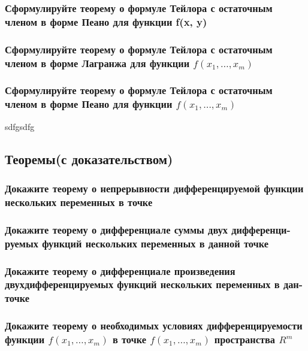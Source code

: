 \documentclass[a4paper, 12pt]{article}
\newcommand{\Rm}{\texorpdfstring{$R^m$}{Lg}}
\def\newline{}%
\begin{document}
            \subsubsection{Сформулируйте теорему о формуле Тейлора с остаточным членом в форме Пеано для функции f(x, y)}



            \subsubsection{Сформулируйте теорему о формуле Тейлора с остаточным членом в форме Лагранжа для функции \texorpdfstring{$f(x_1, \ldots, x_m)$}{Lg}}



            \subsubsection{Сформулируйте теорему о формуле Тейлора с остаточным членом в форме Пеано для функции \texorpdfstring{$f(x_1, \ldots, x_m)$}{Lg}}
            

            sdfgsdfg
        \subsection{Теоремы(с доказательством)}
            \subsubsection{Докажите теорему о непрерывности дифференцируемой функции нескольких переменных в точке}



            \subsubsection{Докажите теорему о дифференциале суммы двух дифференци-\newline руемых функций нескольких переменных в данной точке}



            \subsubsection{Докажите теорему о дифференциале произведения двух\newline дифференцируемых функций нескольких переменных в дан- точке}



            \subsubsection{Докажите теорему о необходимых условиях дифференцируемости функции \texorpdfstring{$f(x_1, \ldots, x_m)$}{Lg} в точке \texorpdfstring{$f(x_1, \ldots, x_m)$}{Lg} пространства \Rm}
\end{document}
